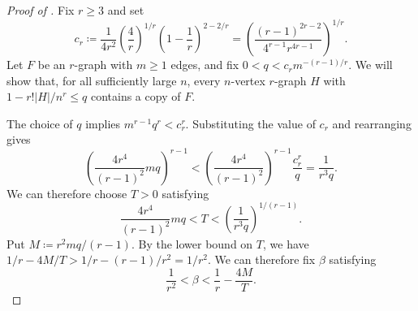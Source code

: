 \documentclass[10pt]{article}
\numberwithin{equation}{section}
\begin{document}
\begin{proof}[Proof of ]
Fix $r\ge3$ and set
\[
c_r\coloneqq
\frac1{4r^2}
\left(\frac4r\right)^{1/r}
\left(1-\frac1r\right)^{2-2/r}
=
\left(\frac{(r-1)^{2r-2}}{4^{r-1}r^{4r-1}}\right)^{1/r}.
\]
Let $F$ be an $r$-graph with $m\ge1$ edges, and fix $0<q<c_rm^{-(r-1)/r}$. We will show that, for all sufficiently large $n$, every $n$-vertex $r$-graph $H$ with $1-r!|H|/n^r\le q$ contains a copy of $F$.

The choice of $q$ implies $m^{r-1}q^r<c_r^r$. Substituting the value of $c_r$ and rearranging gives
\[
\left(\frac{4r^4}{(r-1)^2}mq\right)^{r-1}
<
\left(\frac{4r^4}{(r-1)^2}\right)^{r-1}\frac{c_r^r}{q}
=\frac1{r^3q}.
\]
We can therefore choose $T>0$ satisfying
\begin{equation}\label{eq:T-window}
\frac{4r^4}{(r-1)^2}mq
<T<
\left(\frac1{r^3q}\right)^{1/(r-1)}.
\end{equation}
Put $M\coloneqq r^2mq/(r-1)$. By the lower bound on $T$, we have $1/r-4M/T>1/r-(r-1)/r^2=1/r^2$. We can therefore fix $\beta$ satisfying
\begin{equation}\label{eq:beta-choice}
\frac1{r^2}<\beta<\frac1r-\frac{4M}{T}.
\end{equation}


\end{proof}
\end{document}
